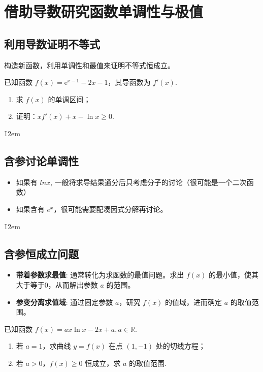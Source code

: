 \section{借助导数研究函数单调性与极值}

\subsection{利用导数证明不等式}

\begin{theorem}[利用导数证明不等式]
    构造新函数，利用单调性和最值来证明不等式恒成立。
\end{theorem}
\begin{example}
    已知函数 $f(x) = \mathrm{e}^{x - 1} - 2x - 1$，其导函数为 $f'(x)$.
    \begin{enumerate}
        \item[(1)] 求 $f(x)$ 的单调区间；
        \item[(2)] 证明：$xf'(x) + x - \ln x \geq 0$.
    \end{enumerate}
\end{example}

\v{12em}

\subsection{含参讨论单调性}

\begin{theorem}[含参讨论单调性]
    \begin{itemize}
        \item 如果有 $lnx$, 一般将求导结果通分后只考虑分子的讨论（很可能是一个二次函数）
        \item 如果含有 $e^x$，很可能需要配凑因式分解再讨论。
    \end{itemize}
\end{theorem}

\v{12em}

\subsection{含参恒成立问题}

\begin{theorem}[含参恒成立问题]
    \begin{itemize}
        \item \textbf{带着参数求最值}: 通常转化为求函数的最值问题。求出 $f(x)$ 的最小值，使其大于等于0，从而解出参数 $a$ 的范围。
        \item \textbf{参变分离求值域}: 通过固定参数 $a$，研究 $f(x)$ 的值域，进而确定 $a$ 的取值范围。
    \end{itemize}
\end{theorem}
\begin{example}
    已知函数 $f(x) = ax\ln x - 2x + a, a \in \mathbb{R}$.
    \begin{enumerate}
        \item[(1)] 若 $a = 1$，求曲线 $y = f(x)$ 在点 $(1, -1)$ 处的切线方程；
        \item[(2)] 若 $a > 0$，$f(x) \geq 0$ 恒成立，求 $a$ 的取值范围.
    \end{enumerate}
\end{example}

